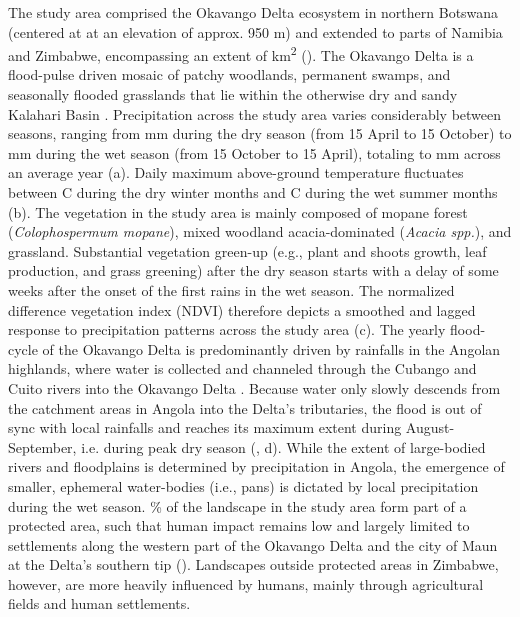 \documentclass[../FinalThesis.tex]{subfiles}
\begin{document}
The study area comprised the Okavango Delta ecosystem in northern Botswana
(centered at  at an elevation of
approx. 950 m) and extended to parts of Namibia and Zimbabwe, encompassing an
extent of  km\textsuperscript{2}
(). The Okavango Delta is a flood-pulse driven mosaic of
patchy woodlands, permanent swamps, and seasonally flooded grasslands that lie
within the otherwise dry and sandy Kalahari Basin \citep{Wilson.1976,
Ramberg.2006, Mendelsohn.2010}. Precipitation across the study area varies
considerably between seasons, ranging from
 mm during the dry season (from
15 April to 15 October) to  mm
during the wet season (from 15 October to 15 April), totaling to
 mm across an average year
(a). Daily maximum above-ground temperature fluctuates between
\degree C during the dry winter
months and \degree C during the
wet summer months (b). The vegetation in the study area is
mainly composed of mopane forest (\textit{Colophospermum mopane}), mixed
woodland acacia-dominated (\textit{Acacia spp.}), and grassland. Substantial
vegetation green-up (e.g., plant and shoots growth, leaf production, and grass
greening) after the dry season starts with a delay of some weeks after the onset
of the first rains in the wet season. The normalized difference vegetation index
(NDVI) therefore depicts a smoothed and lagged response to precipitation
patterns across the study area (c). The yearly flood-cycle of
the Okavango Delta is predominantly driven by rainfalls in the Angolan
highlands, where water is collected and channeled through the Cubango and Cuito
rivers into the Okavango Delta \citep{McCarthy.2003, Gumbricht.2004,
Mendelsohn.2010}. Because water only slowly descends from the catchment areas in
Angola into the Delta's tributaries, the flood is out of sync with local
rainfalls and reaches its maximum extent during August-September, i.e. during
peak dry season (\citealp{Wolski.2017}, d). While the extent
of large-bodied rivers and floodplains is determined by precipitation in Angola,
the emergence of smaller, ephemeral water-bodies (i.e., pans) is dictated by
local precipitation during the wet season.
\% of the landscape in the study
area form part of a protected area, such that human impact remains low and
largely limited to settlements along the western part of the Okavango Delta and
the city of Maun at the Delta's southern tip (). Landscapes
outside protected areas in Zimbabwe, however, are more heavily influenced by
humans, mainly through agricultural fields and human settlements.
\end{document}
